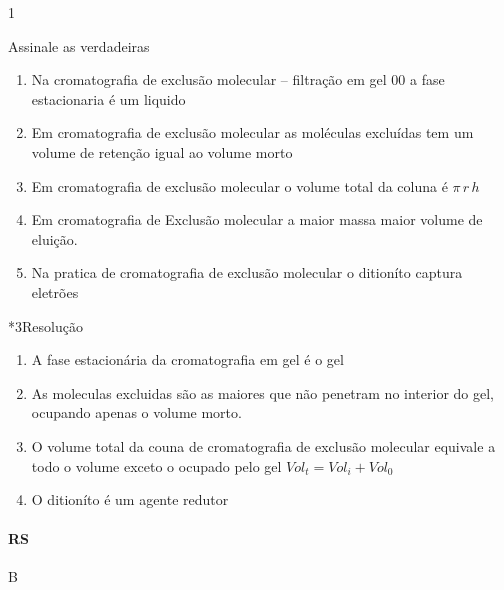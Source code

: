 \documentclass[\mainfilename]{subfiles}
\begin{document}
\begin{questionBox}1{}
    
    Assinale as verdadeiras

    \begin{enumerate}
        \item Na cromatografia de exclusão molecular -- filtração em gel 00 a fase estacionaria é um liquido
        \item Em cromatografia de exclusão molecular as moléculas excluídas tem um volume de retenção igual ao volume morto
        \item Em cromatografia de exclusão molecular o volume total da coluna é \(\pi\,r\,h\)
        \item Em cromatografia de Exclusão molecular a maior massa maior volume de eluição.
        \item Na pratica de cromatografia de exclusão molecular o ditioníto captura eletrões
    \end{enumerate}

    \begin{questionBox}*3{Resolução}
        
        \begin{enumerate}
            \item A fase estacionária da cromatografia em gel é o gel
            \item As moleculas excluidas são as maiores que não penetram no interior do gel, ocupando apenas o volume morto.
            \item O volume total da couna de cromatografia de exclusão molecular equivale a todo o volume exceto o ocupado pelo gel \(Vol_t = Vol_i + Vol_0\)
            \item O ditioníto é um agente redutor
        \end{enumerate}
    
        \paragraph{RS} B
        
    \end{questionBox}
    
\end{questionBox}
\end{document}
